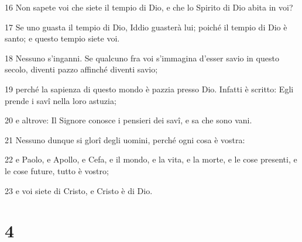 \par 16 Non sapete voi che siete il tempio di Dio, e che lo Spirito di Dio abita in voi?
\par 17 Se uno guasta il tempio di Dio, Iddio guasterà lui; poiché il tempio di Dio è santo; e questo tempio siete voi.
\par 18 Nessuno s'inganni. Se qualcuno fra voi s'immagina d'esser savio in questo secolo, diventi pazzo affinché diventi savio;
\par 19 perché la sapienza di questo mondo è pazzia presso Dio. Infatti è scritto: Egli prende i savî nella loro astuzia;
\par 20 e altrove: Il Signore conosce i pensieri dei savî, e sa che sono vani.
\par 21 Nessuno dunque si glorî degli uomini, perché ogni cosa è vostra:
\par 22 e Paolo, e Apollo, e Cefa, e il mondo, e la vita, e la morte, e le cose presenti, e le cose future, tutto è vostro;
\par 23 e voi siete di Cristo, e Cristo è di Dio.

\chapter{4}

